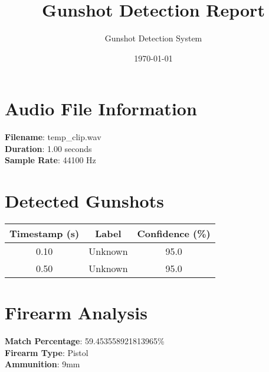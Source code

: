 \documentclass{article}
\title{Gunshot Detection Report}
\author{Gunshot Detection System}
\date{\today}
\begin{document}
\maketitle

\section*{Audio File Information}
\textbf{Filename}: temp_clip.wav\\
\textbf{Duration}: 1.00 seconds\\
\textbf{Sample Rate}: 44100 Hz

\section*{Detected Gunshots}
\begin{tabular}{|c|c|c|}
\hline
Timestamp (s) & Label & Confidence (\%)\\
\hline
0.10 & Unknown & 95.0\\
\hline
0.50 & Unknown & 95.0\\
\hline
\end{tabular}

\section*{Firearm Analysis}
\textbf{Match Percentage}: 59.453558921813965\%\\
\textbf{Firearm Type}: Pistol\\
\textbf{Ammunition}: 9mm\\
\end{document}
